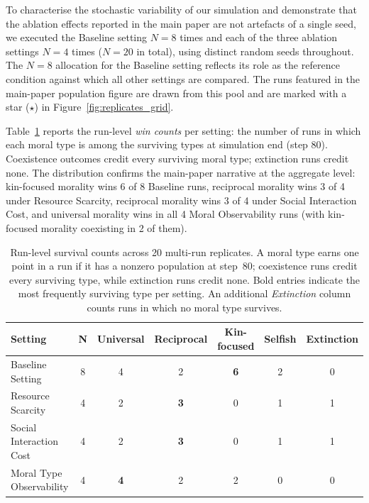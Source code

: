 To characterise the stochastic variability of our simulation and demonstrate that the ablation effects reported in the main paper are not artefacts of a single seed, we executed the Baseline setting $N=8$ times and each of the three ablation settings $N=4$ times ($N=20$ in total), using distinct random seeds throughout. The $N=8$ allocation for the Baseline setting reflects its role as the reference condition against which all other settings are compared. The runs featured in the main-paper population figure are drawn from this pool and are marked with a star ($\star$) in Figure~\ref{fig:replicates_grid}.

Table~\ref{tab:replicate_outcomes} reports the run-level \emph{win counts} per setting: the number of runs in which each moral type is among the surviving types at simulation end (step 80). Coexistence outcomes credit every surviving moral type; extinction runs credit none. The distribution confirms the main-paper narrative at the aggregate level: kin-focused morality wins 6 of 8 Baseline runs, reciprocal morality wins 3 of 4 under Resource Scarcity, reciprocal morality wins 3 of 4 under Social Interaction Cost, and universal morality wins in all 4 Moral Observability runs (with kin-focused morality coexisting in 2 of them).

\begin{table}[htbp]
\centering
\caption{Run-level survival counts across 20 multi-run replicates. A moral type earns one point in a run if it has a nonzero population at step~80; coexistence runs credit every surviving type, while extinction runs credit none. Bold entries indicate the most frequently surviving type per setting. An additional \emph{Extinction} column counts runs in which no moral type survives.}
\label{tab:replicate_outcomes}
\small
\begin{tabular}{l c c c c c c}
\toprule
\textbf{Setting} & \textbf{N} & \textbf{Universal} & \textbf{Reciprocal} & \textbf{Kin-focused} & \textbf{Selfish} & \textbf{Extinction} \\
\midrule
Baseline Setting         & 8 & 4 & 2 & \textbf{6} & 2 & 0 \\
Resource Scarcity        & 4 & 2 & \textbf{3} & 0 & 1 & 1 \\
Social Interaction Cost  & 4 & 2 & \textbf{3} & 0 & 1 & 1 \\
Moral Type Observability & 4 & \textbf{4} & 2 & 2 & 0 & 0 \\
\bottomrule
\end{tabular}
\end{table}

